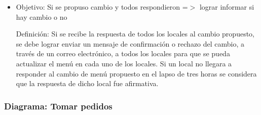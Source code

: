 \documentclass[a4paper,11pt] {article}
\begin{document}
\begin{itemize}
\item 
Objetivo: Si se propuso cambio y todos respondieron =$>$ lograr informar si hay cambio o no

Definici\'on: Si se recibe la respuesta de todos los locales al cambio propuesto, se debe lograr enviar un mensaje de confirmaci\'on o rechazo del cambio, a trav\'es de un correo electrónico, a todos los locales para que se pueda actualizar el men\'u en cada uno de los locales. Si un local no llegara a responder al cambio de men\'u propuesto en el lapso de tres horas se considera que la respuesta de dicho local fue afirmativa.

\end{itemize}

\subsubsection*{Diagrama: Tomar pedidos}
\end{document}
